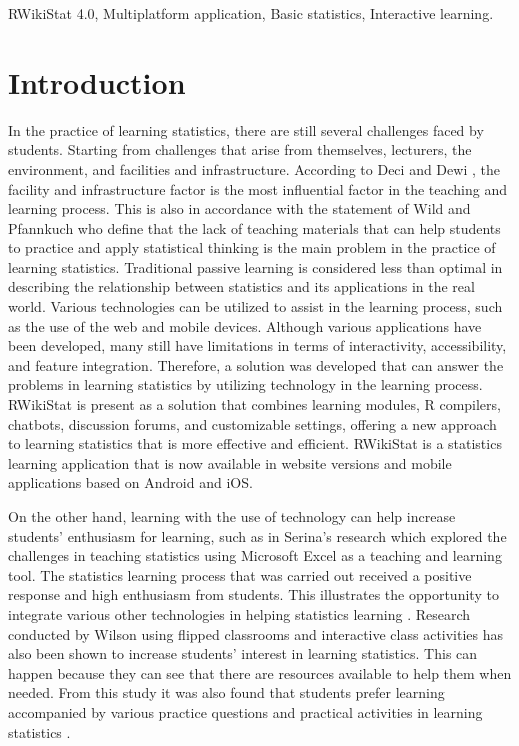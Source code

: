 \documentclass[conference,a4paper]{IEEEtran}
\begin{document}
\begin{IEEEkeywords}
  RWikiStat 4.0, Multiplatform application, Basic statistics, Interactive learning.
\end{IEEEkeywords}

\section{Introduction}
\label{sect:introduction}

In the practice of learning statistics, there are still several challenges faced by students. Starting from challenges that arise from themselves, lecturers, the environment, and facilities and infrastructure. According to Deci and Dewi \cite{b1}, the facility and infrastructure factor is the most influential factor in the teaching and learning process. This is also in accordance with the statement of Wild and Pfannkuch \cite{b2} who define that the lack of teaching materials that can help students to practice and apply statistical thinking is the main problem in the practice of learning statistics. Traditional passive learning is considered less than optimal in describing the relationship between statistics and its applications in the real world.
Various technologies can be utilized to assist in the learning process, such as the use of the web and mobile devices. Although various applications have been developed, many still have limitations in terms of interactivity, accessibility, and feature integration. Therefore, a solution was developed that can answer the problems in learning statistics by utilizing technology in the learning process. RWikiStat is present as a solution that combines learning modules, R compilers, chatbots, discussion forums, and customizable settings, offering a new approach to learning statistics that is more effective and efficient. RWikiStat is a statistics learning application that is now available in website versions and mobile applications based on Android and iOS.

On the other hand, learning with the use of technology can help increase students' enthusiasm for learning, such as in Serina's research which explored the challenges in teaching statistics using Microsoft Excel as a teaching and learning tool. The statistics learning process that was carried out received a positive response and high enthusiasm from students. This illustrates the opportunity to integrate various other technologies in helping statistics learning \cite{b3}. Research conducted by Wilson using flipped classrooms and interactive class activities has also been shown to increase students' interest in learning statistics. This can happen because they can see that there are resources available to help them when needed. From this study it was also found that students prefer learning accompanied by various practice questions and practical activities in learning statistics \cite{b4}.
\end{document}
